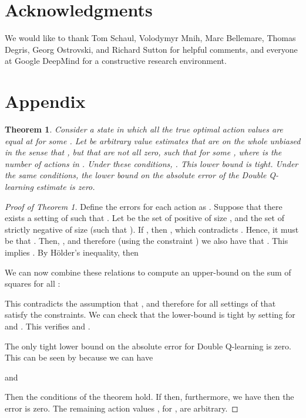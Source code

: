 \documentclass[letterpaper]{article}
\newtheorem{theorem}{Theorem}
\begin{document}
\section*{Acknowledgments}
We would like to thank Tom Schaul, Volodymyr Mnih, Marc Bellemare, Thomas Degris, Georg Ostrovski, and Richard Sutton for helpful comments, and everyone at Google DeepMind for a constructive research environment.
\small


\newpage
\section*{Appendix}
\setcounter{theorem}{0}
\begin{theorem}
Consider a state  in which all the true optimal action values are equal at  for some . Let  be arbitrary value estimates that are on the whole unbiased in the sense that , but that are not all zero, such that  for some , where  is the number of actions in . Under these conditions, .  This lower bound is tight. Under the same conditions, the lower bound on the absolute error of the Double Q-learning estimate is zero.
\end{theorem}
\begin{proof}[Proof of Theorem 1]
Define the errors for each action  as . Suppose that there exists a setting of  such that . Let  be the set of positive  of size , and  the set of strictly negative  of size  (such that ). If , then , which contradicts . Hence, it must be that . Then, , and therefore (using the constraint ) we also have that . This implies . 
By H\"{o}lder's inequality, then

We can now combine these relations to compute an upper-bound on the sum of squares for all :

This contradicts the assumption that , and therefore  for all settings of  that satisfy the constraints. We can check that the lower-bound is tight by setting  for  and . This verifies  and .

The only tight lower bound on the absolute error for Double Q-learning  is zero.
This can be seen by because we can have

and

Then the conditions of the theorem hold.  If then, furthermore, we have  then the error is zero.  The remaining action values , for , are arbitrary.
\end{proof}
\end{document}

